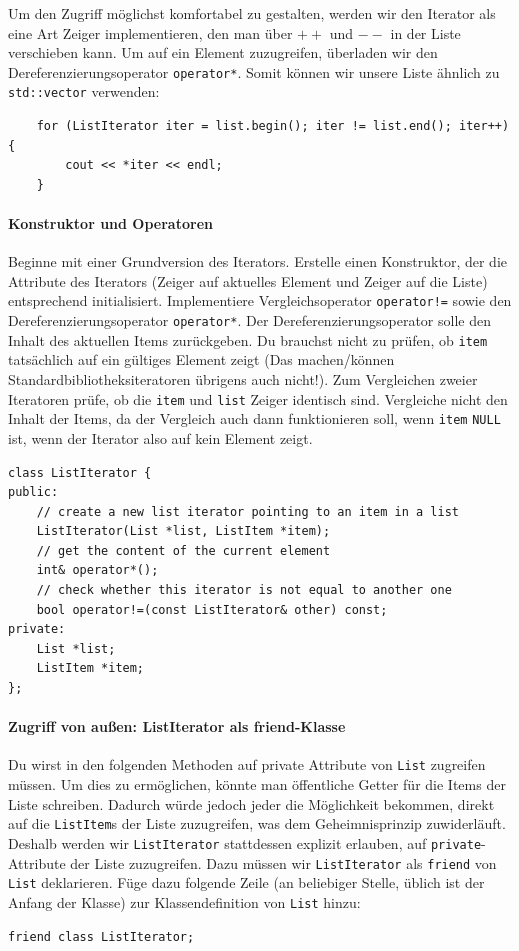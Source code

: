 Um den Zugriff möglichst komfortabel zu gestalten, werden wir den Iterator als eine Art Zeiger implementieren, den man über \textbf{$++$} und \textbf{$--$} in der Liste verschieben kann.
Um auf ein Element zuzugreifen, überladen wir den Dereferenzierungsoperator \texttt{operator*}.
Somit können wir unsere Liste ähnlich zu \texttt{std::vector} verwenden:
\begin{lstlisting}
	for (ListIterator iter = list.begin(); iter != list.end(); iter++) {
		cout << *iter << endl;
	}
\end{lstlisting}

\paragraph{Konstruktor und Operatoren} 
Beginne mit einer Grundversion des Iterators.
Erstelle einen Konstruktor, der die Attribute des Iterators (Zeiger auf aktuelles Element und Zeiger auf die Liste) entsprechend initialisiert.
Implementiere Vergleichsoperator \texttt{operator!=} sowie den Dereferenzierungsoperator \texttt{operator*}.
Der Dereferenzierungsoperator solle den Inhalt des aktuellen Items zurückgeben.
Du brauchst nicht zu prüfen, ob \texttt{item} tatsächlich auf ein gültiges Element zeigt (Das machen/können Standardbibliotheksiteratoren übrigens auch nicht!).
Zum Vergleichen zweier Iteratoren prüfe, ob die \texttt{item} und \texttt{list} Zeiger identisch sind.
Vergleiche nicht den Inhalt der Items, da der Vergleich auch dann funktionieren soll, wenn \texttt{item} \texttt{NULL} ist, wenn der Iterator also auf kein Element zeigt.

\begin{lstlisting}
class ListIterator {
public:
	// create a new list iterator pointing to an item in a list
	ListIterator(List *list, ListItem *item);
	// get the content of the current element
	int& operator*();
	// check whether this iterator is not equal to another one
	bool operator!=(const ListIterator& other) const;
private:
	List *list;
	ListItem *item;
};
\end{lstlisting}


\paragraph{Zugriff von außen: ListIterator als friend-Klasse} Du wirst in den folgenden Methoden auf private Attribute von \texttt{List} zugreifen müssen.
Um dies zu ermöglichen, könnte man öffentliche Getter für die Items der Liste schreiben.
Dadurch würde jedoch jeder die Möglichkeit bekommen, direkt auf die \texttt{ListItem}s der Liste zuzugreifen, was dem Geheimnisprinzip zuwiderläuft.
Deshalb werden wir \texttt{ListIterator} stattdessen explizit erlauben, auf \texttt{private}-Attribute der Liste zuzugreifen.
Dazu müssen wir \texttt{ListIterator} als \texttt{friend} von \texttt{List} deklarieren.
Füge dazu folgende Zeile (an beliebiger Stelle, üblich ist der Anfang der Klasse) zur Klassendefinition von \texttt{List} hinzu:
\begin{lstlisting}
friend class ListIterator;
\end{lstlisting}

